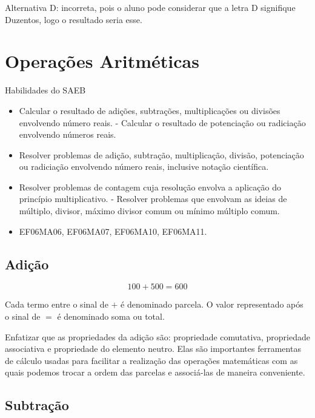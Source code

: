 Alternativa D: incorreta, pois o aluno pode considerar que a letra D
signifique Duzentos, logo o resultado seria esse.

\chapter{Operações
Aritméticas}

Habilidades do SAEB 


\begin{itemize}
\item 
  Calcular o resultado de adições, subtrações,
multiplicações ou divisões envolvendo número reais. - Calcular o
resultado de potenciação ou radiciação envolvendo números reais.

\item
  Resolver problemas de adição, subtração, multiplicação, divisão,
  potenciação ou radiciação envolvendo número reais, inclusive notação
  científica.

\item
  Resolver problemas de contagem cuja resolução envolva a aplicação do
  princípio multiplicativo. - Resolver problemas que envolvam as ideias
  de múltiplo, divisor, máximo divisor comum ou mínimo múltiplo comum.
\end{itemize}


\begin{itemize} 
\item  EF06MA06, EF06MA07, EF06MA10, EF06MA11.
\end{itemize}

\section*{Adição}


$$100 + 500 = 600$$


Cada termo entre o sinal de $+$ é denominado parcela. O valor representado
após o sinal de $=$ é denominado soma ou total.

Enfatizar que as propriedades da adição são: propriedade comutativa,
propriedade associativa e propriedade do elemento neutro. Elas são
importantes ferramentas de cálculo usadas para facilitar a realização
das operações matemáticas com as quais podemos trocar a ordem das
parcelas e associá-las de maneira conveniente.

\section*{Subtração}

